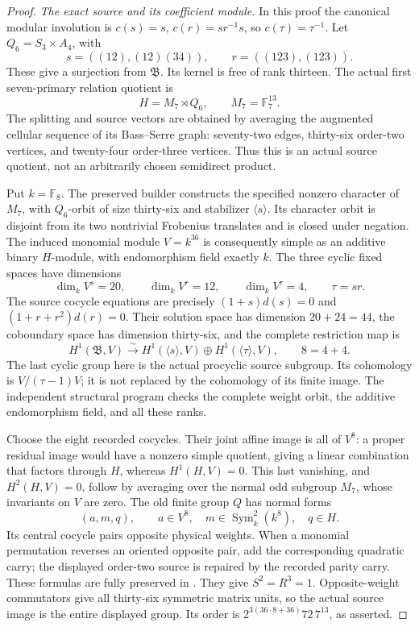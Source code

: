 \begin{proof}
\emph{The exact source and its coefficient module.}
In this proof the canonical modular involution is
\(c(s)=s\), \(c(r)=sr^{-1}s\), so \(c(\tau)=\tau^{-1}\).
Let \(Q_6=S_3\times A_4\), with
\[
 s=((12),(12)(34)),\qquad r=((123),(123)).
\]
These give a surjection from \(\mathfrak B\). Its kernel is
free of rank thirteen. The actual first seven-primary relation
quotient is
\[
 H=M_7\rtimes Q_6,\qquad M_7=\mathbb F_7^{13}.
\]
The splitting and source vectors are obtained by averaging the
augmented cellular sequence of its Bass--Serre graph: seventy-two
edges, thirty-six order-two vertices, and twenty-four order-three
vertices. Thus this is an actual source quotient, not an arbitrarily
chosen semidirect product.

Put \(k=\mathbb F_8\). The preserved builder
constructs the specified nonzero character of \(M_7\), with
\(Q_6\)-orbit of size thirty-six and stabilizer \(\langle s\rangle\).
Its character orbit is disjoint from its two nontrivial Frobenius
translates and is closed under negation. The induced monomial module
\(V=k^{36}\) is consequently simple as an additive binary
\(H\)-module, with endomorphism field exactly \(k\).
The three cyclic fixed spaces have dimensions
\[
 \dim_k V^s=20,\qquad \dim_k V^r=12,\qquad
 \dim_k V^\tau=4,
 \qquad \tau=sr.
\]
The source cocycle equations are precisely
\((1+s)d(s)=0\) and \((1+r+r^2)d(r)=0\).
Their solution space has dimension \(20+24=44\), the coboundary
space has dimension thirty-six, and the complete restriction map is
\[
 H^1(\mathfrak B,V)\xrightarrow{\sim}
 H^1(\langle s\rangle,V)\oplus H^1(\langle\tau\rangle,V),
 \qquad 8=4+4.                                      \tag{E.59.1}
\]
The last cyclic group here is the actual procyclic source subgroup.
Its cohomology is \(V/(\tau-1)V\); it is not replaced by the
cohomology of its finite image.
The independent structural program
 checks the complete
weight orbit, the additive endomorphism field, and all these ranks.

Choose the eight recorded cocycles. Their joint affine image is
all of \(V^8\): a proper residual image would have a nonzero
simple quotient, giving a linear combination that factors through
\(H\), whereas \(H^1(H,V)=0\). This last vanishing, and
\(H^2(H,V)=0\), follow by averaging over the normal odd subgroup
\(M_7\), whose invariants on \(V\) are zero. The old finite
group \(Q\) has normal forms
\[
 (a,m,q),\qquad a\in V^8,\quad
 m\in\operatorname{Sym}^2_k(k^8),\quad q\in H.
\]
Its central cocycle pairs opposite physical weights. When a monomial
permutation reverses an oriented opposite pair, add the corresponding
quadratic carry; the displayed order-two source is repaired by the
recorded parity carry. These formulas are fully preserved in
.
They give \(S^2=R^3=1\). Opposite-weight commutators give all
thirty-six symmetric matrix units, so the actual source image is the
entire displayed group. Its order is
\(2^{3(36\cdot8+36)}72\,7^{13}\), as asserted.


\end{proof}
